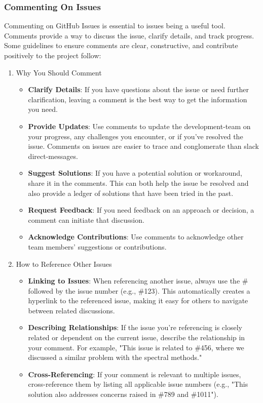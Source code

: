 \documentclass{ol-softwaremanual}
\begin{document}
\subsubsection{Commenting On Issues}
Commenting on GitHub Issues is essential to issues being a useful tool. Comments provide a way to discuss the issue, clarify details, and track progress. Some guidelines to ensure comments are clear, constructive, and contribute positively to the project follow:
\begin{enumerate}
\item Why You Should Comment
\begin{itemize}
    \item \textbf{Clarify Details}: If you have questions about the issue or need further clarification, leaving a comment is the best way to get the information you need.
    \item \textbf{Provide Updates}: Use comments to update the development-team on your progress, any challenges you encounter, or if you've resolved the issue. Comments on issues are easier to trace and conglomerate than slack direct-messages.
    \item \textbf{Suggest Solutions}: If you have a potential solution or workaround, share it in the comments. This can both help the issue be resolved and also provide a ledger of solutions that have been tried in the past.
    \item \textbf{Request Feedback}: If you need feedback on an approach or decision, a comment can initiate that discussion.
    \item \textbf{Acknowledge Contributions}: Use comments to acknowledge other team members' suggestions or contributions.
\end{itemize}
\item How to Reference Other Issues
\begin{itemize}
    \item \textbf{Linking to Issues}: When referencing another issue, always use the \# followed by the issue number (e.g., \#123). This automatically creates a hyperlink to the referenced issue, making it easy for others to navigate between related discussions.
    \item \textbf{Describing Relationships}: If the issue you’re referencing is closely related or dependent on the current issue, describe the relationship in your comment. For example, "This issue is related to \#456, where we discussed a similar problem with the spectral methods."
    \item \textbf{Cross-Referencing}: If your comment is relevant to multiple issues, cross-reference them by listing all applicable issue numbers (e.g., "This solution also addresses concerns raised in \#789 and \#1011").

\end{itemize}
\end{enumerate}
\end{document}
